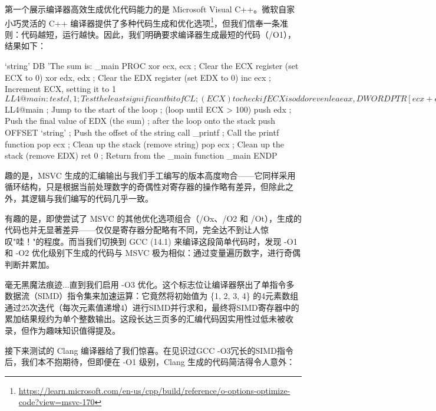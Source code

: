 第一个展示编译器高效生成优化代码能力的是 Microsoft Visual C++。微软自家小巧灵活的 C++ 编译器提供了多种代码生成和优化选项\footnote{\url{https://learn.microsoft.com/en-us/cpp/build/reference/o-options-optimize-code?view=msvc-170}}，但我们信奉一条准则：代码越短，运行越快。因此，我们明确要求编译器生成最短的代码（/O1），结果如下：

\begin{shell}
`string' DB 'The sum is: %
_main PROC
  xor ecx, ecx  ; Clear the ECX register (set ECX to 0)
  xor edx, edx  ; Clear the EDX register (set EDX to 0)
  inc ecx       ; Increment ECX, setting it to 1
  $LL4@main:
  test cl, 1    ; Test the least significant bit of CL
                ; (ECX) to check if ECX is odd or even
  lea eax, DWORD PTR [ecx+edx] ; Load the effective
                ; address of ECX + EDX into EAX
  cmove eax, edx; If the zero flag is set
                ; (ECX was even), move EDX into EAX
  inc ecx       ; Increment ECX by 1
  mov edx, eax  ; Move the value in EAX to EDX
                ; (update EDX for the next iteration)
  cmp ecx, 100  ; Compare ECX with 100
  jle SHORT $LL4@main ; Jump to the start of the loop
                ; (loop until ECX > 100)
  push edx      ; Push the final value of EDX (the sum)
                ; after the loop onto the stack
  push OFFSET `string' ; Push the offset of the string
  call _printf  ; Call the printf function
  pop ecx       ; Clean up the stack (remove string)
  pop ecx       ; Clean up the stack (remove EDX)
  ret 0         ; Return from the _main function
_main ENDP
\end{shell}

趣的是，MSVC 生成的汇编输出与我们手工编写的版本高度吻合——它同样采用循环结构，只是根据当前处理数字的奇偶性对寄存器的操作略有差异，但除此之外，其逻辑与我们编写的代码几乎一致。

有趣的是，即使尝试了 MSVC 的其他优化选项组合（/Ox、/O2 和 /Ot），生成的代码也并无显著差异——仅仅是寄存器分配略有不同，完全达不到让人惊叹"哇！"的程度。而当我们切换到 GCC (14.1) 来编译这段简单代码时，发现 -O1 和 -O2 优化级别下生成的代码与 MSVC 极为相似：通过变量遍历数字，进行奇偶判断并累加。

毫无黑魔法痕迹...直到我们启用 -O3 优化。这个标志位让编译器祭出了单指令多数据流（SIMD）指令集来加速运算：它竟然将初始值为 \{1, 2, 3, 4\} 的4元素数组通过25次迭代（每次元素值递增4）进行SIMD并行求和，最终将SIMD寄存器中的累加结果规约为单个整数输出。这段长达三页多的汇编代码因实用性过低未被收录，但作为趣味知识值得提及。

接下来测试的 Clang 编译器给了我们惊喜。在见识过GCC -O3冗长的SIMD指令后，我们本不抱期待，但即便在 -O1 级别，Clang 生成的代码简洁得令人意外：

